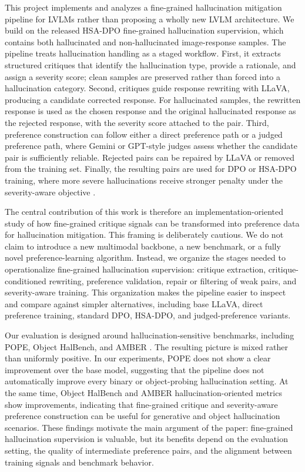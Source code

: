 \documentclass{article}
\begin{document}
This project implements and analyzes a fine-grained hallucination mitigation pipeline for LVLMs rather than proposing a wholly new LVLM architecture. We build on the released HSA-DPO fine-grained hallucination supervision, which contains both hallucinated and non-hallucinated image-response samples. The pipeline treats hallucination handling as a staged workflow. First, it extracts structured critiques that identify the hallucination type, provide a rationale, and assign a severity score; clean samples are preserved rather than forced into a hallucination category. Second, critiques guide response rewriting with LLaVA, producing a candidate corrected response. For hallucinated samples, the rewritten response is used as the chosen response and the original hallucinated response as the rejected response, with the severity score attached to the pair. Third, preference construction can follow either a direct preference path or a judged preference path, where Gemini or GPT-style judges assess whether the candidate pair is sufficiently reliable. Rejected pairs can be repaired by LLaVA or removed from the training set. Finally, the resulting pairs are used for DPO or HSA-DPO training, where more severe hallucinations receive stronger penalty under the severity-aware objective \citep{rafailov2024dpo,xiao2025hsa}.

The central contribution of this work is therefore an implementation-oriented study of how fine-grained critique signals can be transformed into preference data for hallucination mitigation. This framing is deliberately cautious. We do not claim to introduce a new multimodal backbone, a new benchmark, or a fully novel preference-learning algorithm. Instead, we organize the stages needed to operationalize fine-grained hallucination supervision: critique extraction, critique-conditioned rewriting, preference validation, repair or filtering of weak pairs, and severity-aware training. This organization makes the pipeline easier to inspect and compare against simpler alternatives, including base LLaVA, direct preference training, standard DPO, HSA-DPO, and judged-preference variants.

Our evaluation is designed around hallucination-sensitive benchmarks, including POPE, Object HalBench, and AMBER \citep{li2023pope,rohrbach2018object,wang2023amber}. The resulting picture is mixed rather than uniformly positive. In our experiments, POPE does not show a clear improvement over the base model, suggesting that the pipeline does not automatically improve every binary or object-probing hallucination setting. At the same time, Object HalBench and AMBER hallucination-oriented metrics show improvements, indicating that fine-grained critique and severity-aware preference construction can be useful for generative and object hallucination scenarios. These findings motivate the main argument of the paper: fine-grained hallucination supervision is valuable, but its benefits depend on the evaluation setting, the quality of intermediate preference pairs, and the alignment between training signals and benchmark behavior.
\end{document}
